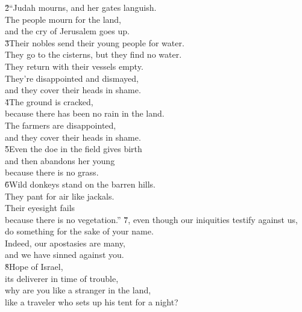 \begin{poetry}
\poeml \v{2}``Judah mourns, and her gates languish. \\
\poemll    The people mourn for the land, \\
\poemll    and the cry of Jerusalem goes up. \\
\poeml \v{3}Their nobles send their young people for water. \\
\poemll    They go to the cisterns, but they find no water. \\
\poeml They return with their vessels empty. \\
\poemll    They're disappointed and dismayed, \\
\poemlll       and they cover their heads in shame. \\
\poeml \v{4}The ground is cracked, \\
\poemll    because there has been no rain in the land. \\
\poeml The farmers are disappointed, \\
\poemll    and they cover their heads in shame. \\
\poeml \v{5}Even the doe in the field gives birth \\
\poemll    and then abandons her young \\
\poemlll       because there is no grass. \\
\poeml \v{6}Wild donkeys stand on the barren hills. \\
\poemll    They pant for air like jackals. \\
\poeml Their eyesight fails \\
\poemll    because there is no vegetation.''
\poeml \v{7}, even though our iniquities testify against us, \\
\poemll    do something for the sake of your name. \\
\poeml Indeed, our apostasies are many, \\
\poemll    and we have sinned against you. \\
\poeml \v{8}Hope of Israel, \\
\poemll    its deliverer in time of trouble, \\
\poeml why are you like a stranger in the land, \\
\poemll    like a traveler who sets up his tent for a night? \\

\end{poetry}
